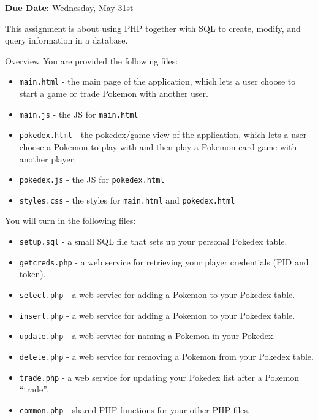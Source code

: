 \documentclass[programming]{../../../../mfcs}
\newcommand{\projectduedate}{Wednesday, May 31st}
\begin{document}
\vspace{-3.8em}

\hfill\begin{varwidth}{0.5\textwidth}
{\large {\bf\color{colour} Due Date:} \projectduedate}
\end{varwidth}
\vspace{2em}

This assignment is about using PHP together with SQL to create, modify, and query information in a database.

\vspace{2em}
\begin{question}{Overview}
  You are provided the following files:
  \begin{itemize}
    \item \texttt{main.html} - the main page of the application, which lets a user choose to start a
      game or trade Pokemon with another user.
    \item \texttt{main.js} - the JS for \texttt{main.html}
    \item \texttt{pokedex.html} - the pokedex/game view of the application, which lets a user choose
      a Pokemon to play with and then play a Pokemon card game with another player.
    \item \texttt{pokedex.js} - the JS for \texttt{pokedex.html}
    \item \texttt{styles.css} - the styles for \texttt{main.html} and \texttt{pokedex.html}
  \end{itemize}

  You will turn in the following files:
  \begin{itemize}
    \item \texttt{setup.sql} - a small SQL file that sets up your personal Pokedex table.
    \item \texttt{getcreds.php} - a web service for retrieving your player credentials (PID and token).
    \item \texttt{select.php} - a web service for adding a Pokemon to your Pokedex table.
    \item \texttt{insert.php} - a web service for adding a Pokemon to your Pokedex table.
    \item \texttt{update.php} - a web service for naming a Pokemon in your Pokedex.
    \item \texttt{delete.php} - a web service for removing a Pokemon from your Pokedex table.
    \item \texttt{trade.php} - a web service for updating your Pokedex list after a Pokemon ``trade''.
    \item \texttt{common.php} - shared PHP functions for your other PHP files.
  \end{itemize}
\end{question}
\end{document}
